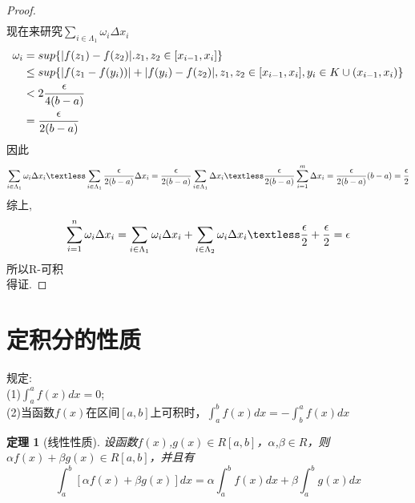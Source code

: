 \documentclass[12pt, a4paper, oneside]{ctexart}
\newtheorem{theorem}{定理}[section]
\begin{document}
\begin{proof}
\begin{equation*}
\begin{aligned}
\end{aligned}
\end{equation*}
现在来研究$\sum_{i \in \Lambda_1}\omega_i \Delta x_i$
\begin{equation*}
    \begin{aligned}
        \omega_i&=sup\{|f(z_1)-f(z_2)|.z_1,z_2 \in [x_{i-1},x_i]   \}\\
        & \leq sup\{|f(z_1-f(y_i))|+|f(y_i)-f(z_2)|,    z_1,z_2 \in [x_{i-1},x_i],y_i \in K \cup (x_{i-1},x_i)        \}\\
        & \textless 2\frac{\epsilon}{4(b-a)}\\
        &=\frac{\epsilon}{2(b-a)}
    \end{aligned}
\end{equation*}
因此
\begin{equation*}
    \begin{aligned}
        \sum_{i \in \Lambda_1}\omega_i \Delta x_i \textless \sum_{i \in \Lambda_1}\frac{\epsilon}{2(b-a)} \Delta x_i=\frac{\epsilon}{2(b-a)} \sum_{i \in \Lambda_1}\Delta x_i \textless \frac{\epsilon}{2(b-a)}\sum_{i=1}^{m}\Delta x_i=\frac{\epsilon}{2(b-a)}(b-a)=\frac{\epsilon}{2}
    \end{aligned}
\end{equation*}
综上,
\begin{equation*}
    \sum_{i=1}^{n}\omega_i \Delta x_i=\sum_{i \in \Lambda_1}\omega_i \Delta x_i+\sum_{i \in \Lambda_2}\omega_i \Delta x_i \textless \frac{\epsilon}{2} +\frac{\epsilon}{2}=\epsilon
\end{equation*}
所以R-可积\\
得证.
\end{proof}


\section{定积分的性质}
规定:\\
(1)$\int_{a}^{a}f(x)dx=0$;\\
(2)当函数$f(x)$在区间$[a,b]$上可积时，$\int_{a}^{b}f(x)dx=-\int_{b}^{a}f(x)dx$

\begin{theorem}[线性性质]
设函数$f(x)$,$g(x)\in R[a,b]$，$\alpha$,$\beta \in R$，则$\alpha f(x)+\beta g(x)\in R[a,b]$，并且有
\begin{equation*}
\int_{a}^{b}[\alpha f(x)+\beta g(x)]dx=\alpha \int_{a}^{b}f(x)dx+\beta \int_{a}^{b}g(x)dx
\end{equation*}
\end{theorem}
\end{document}
